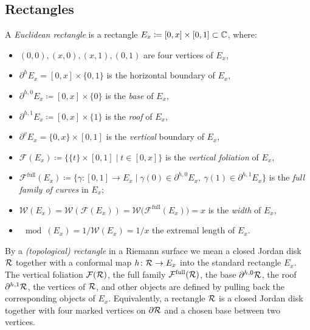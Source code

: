 \documentclass{amsart}
\newcommand\full{{\operatorname{full}}}
\renewcommand{\sp}{{\ \ }}
\newcommand{\1}{{\mathbb 1 }}
\newcommand{\Fam}{{\mathcal F}}
\newcommand{\Width}{{\mathcal W}}
\begin{document}
 \subsection{Rectangles} \label{ss:rectangles} A \emph{Euclidean rectangle} is a rectangle $E_x\coloneqq[0,x]\times [0,1] \subset {\Bbb C}$, where:
\begin{itemize}
\item $(0,0), (x,0), (x,1), (0,1)$ are four vertices of $E_x$,
\item $\partial^h E_x=[0,x]\times\{0,1\}$ is the horizontal boundary of $E_x$,
\item $\partial^{h,0} E_x\coloneqq [0,x]\times\{0\}$ is the \emph{base} of $E_x$,
\item $\partial^{h,1} E_x\coloneqq [0,x]\times\{1\}$ is the \emph{roof} of $E_x$,
\item $\partial^v E_x=\{0,x\}\times [0,1]$ is the \emph{vertical} boundary of $E_x$,
\item $\Fam(E_x)\coloneqq \{\{t\}\times[0,1]\mid t\in [0,x]\}$ is the \emph{vertical foliation} of $E_x$,
\item $\Fam^\full(E_x)\coloneqq \{\gamma\colon [0,1]\to E_x \mid \gamma(0)\in \partial ^{h,0}E_x,\ \gamma(1)\in \partial ^{h,1}E_x \}$ is the \emph{full family of curves} in $E_x$; 
\item $\Width(E_x)=\Width(\Fam(E_x))=\Width\big(\Fam^\full(E_x)\big)=x$ is the \emph{width} of $E_x$,
\item $\mod (E_x)=1/\Width(E_x)=1/x$ the extremal length of $E_x$.
\end{itemize}

By a \emph{(topological) rectangle} in a Riemann surface we mean a closed Jordan disk ${\mathcal R}$ together with a conformal map $h\colon {\mathcal R}\to E_x$ into the standard rectangle $E_x$.  The vertical foliation $\Fam(\RR)$, the full family $\Fam^\full(\RR)$, the base $\partial^{h,0}{\mathcal R}$, the roof $\partial^{h,1}{\mathcal R}$, the vertices of ${\mathcal R}$, and other objects are defined by pulling back the corresponding objects of $E_x$. Equivalently, a rectangle ${\mathcal R}$ is a closed Jordan disk together with four marked vertices on $\partial {\mathcal R}$ and a chosen base between two vertices.
\end{document}
